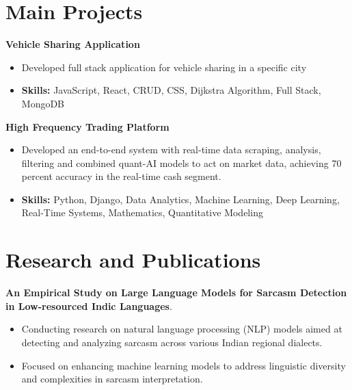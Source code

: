 \documentclass[a4paper,11pt]{article}
\begin{document}
\section{\textbf{Main Projects}}

\vspace{1mm}
  \textbf{Vehicle Sharing Application  }
\vspace{-1.5mm} %
\begin{itemize}
  \item Developed full stack application for vehicle sharing in a specific city
\vspace{-3mm}
  \item \textbf{Skills:} JavaScript, React, CRUD, CSS, Dijkstra Algorithm, Full Stack, MongoDB
\end{itemize}


\vspace{1mm}
   \textbf{High Frequency Trading Platform }
\vspace{-1.5mm} %
\begin{itemize}
  \item Developed an end-to-end system with real-time data scraping, analysis, filtering and combined quant-AI models to act on market data, achieving 70 percent accuracy in the real-time cash segment.
\vspace{-3mm}
  \item \textbf{Skills:} Python, Django, Data Analytics, Machine Learning, Deep Learning, Real-Time Systems, Mathematics, Quantitative Modeling
\end{itemize}



\section{\textbf{Research and Publications} \hfill }
\vspace{1mm}
  \textbf{An Empirical Study on Large Language Models for Sarcasm Detection in Low-resourced Indic Languages}.
\vspace{-1mm} %
\begin{itemize}
  \item Conducting research on natural language processing (NLP) models aimed at detecting and analyzing sarcasm across various Indian regional dialects.
\vspace{-3mm}
  \item Focused on enhancing machine learning models to address linguistic diversity and complexities in sarcasm interpretation.
\end{itemize}
\end{document}
